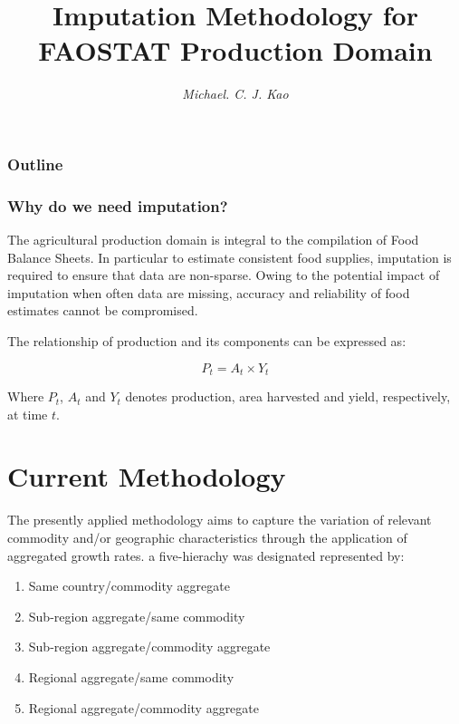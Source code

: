 \documentclass{beamer}
\title{Imputation Methodology for FAOSTAT Production Domain}
\author{\it Michael. C. J.  Kao}
\institute{Food and Agriculture Organization \\of the United Nation}
\date{}
\begin{document}
\frame{
  \titlepage
}

\begin{frame}
  \frametitle{Outline}
  \tableofcontents
\end{frame}



\begin{frame}
  \frametitle{Why do we need imputation?}

  The agricultural production domain is integral to the compilation of
  Food Balance Sheets. In particular to estimate consistent food
  supplies, imputation is required to ensure that data are non-sparse.
  Owing to the potential impact of imputation when often data are
  missing, accuracy and reliability of food estimates cannot be
  compromised.
  
  \vspace{0.5cm}
  The relationship of production and its components can be expressed as:

  \begin{equation}
    P_t = A_t \times Y_t
  \end{equation}
  
  Where $P_t$, $A_t$ and $Y_t$ denotes production, area harvested and
  yield, respectively, at time $t$.

\end{frame}  


\section{Current Methodology}

\begin{frame}

  The presently applied methodology aims to capture the variation of relevant
  commodity and/or geographic characteristics through the application
  of aggregated growth rates. a five-hierachy was designated represented 
  by:

  \begin{enumerate}
    \item Same country/commodity aggregate
    \item Sub-region aggregate/same commodity
    \item Sub-region aggregate/commodity aggregate
    \item Regional aggregate/same commodity
    \item Regional aggregate/commodity aggregate
  \end{enumerate}

\end{frame}
\end{document}
